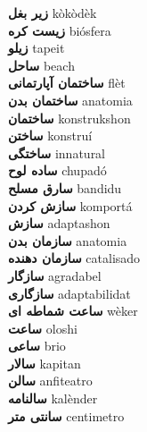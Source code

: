 \textbf{ زیر بغل  } kòkòdèk \\
\textbf{ زیست کره  } biósfera \\
\textbf{ زیلو  } tapeit \\
\textbf{ ساحل  } beach \\
\textbf{ ساختمان آپارتمانی  } flèt \\
\textbf{ ساختمان بدن  } anatomia \\
\textbf{ ساختمان  } konstrukshon \\
\textbf{ ساختن  } konstruí \\
\textbf{ ساختگی  } innatural \\
\textbf{ ساده لوح  } chupadó \\
\textbf{ سارق مسلح  } bandidu \\
\textbf{ سازش کردن  } komportá \\
\textbf{ سازش  } adaptashon \\
\textbf{ سازمان بدن  } anatomia \\
\textbf{ سازمان دهنده  } catalisado \\
\textbf{ سازگار  } agradabel \\
\textbf{ سازگاری  } adaptabilidat \\
\textbf{ ساعت شماطه ای  } wèker \\
\textbf{ ساعت  } oloshi \\
\textbf{ ساعی  } brio \\
\textbf{ سالار  } kapitan \\
\textbf{ سالن  } anfiteatro \\
\textbf{ سالنامه  } kalènder \\
\textbf{ سانتی متر  } centimetro \\
